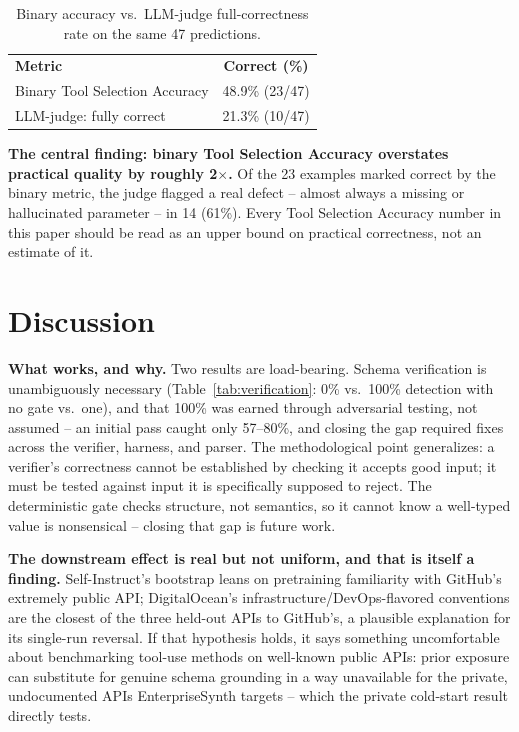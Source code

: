 \documentclass[letterpaper]{article} %
\begin{document}
\begin{table}[t]
\centering
\footnotesize
\setlength{\tabcolsep}{3pt}
\begin{tabular}{lc}
\textbf{Metric} & \textbf{Correct (\%)} \\
Binary Tool Selection Accuracy & 48.9\% (23/47) \\
LLM-judge: fully correct & 21.3\% (10/47) \\
\end{tabular}
\caption{Binary accuracy vs.\ LLM-judge full-correctness rate on the same 47 predictions.}
\label{tab:judge}
\end{table}

\textbf{The central finding: binary Tool Selection Accuracy overstates practical quality by
roughly 2$\times$.} Of the 23 examples marked correct by the binary metric, the judge flagged a
real defect -- almost always a missing or hallucinated parameter -- in 14 (61\%). Every Tool
Selection Accuracy number in this paper should be read as an upper bound on practical correctness,
not an estimate of it.

\section{Discussion}
\textbf{What works, and why.} Two results are load-bearing. Schema verification is unambiguously
necessary (Table~\ref{tab:verification}: 0\% vs.\ 100\% detection with no gate vs.\ one), and that
100\% was earned through adversarial testing, not assumed -- an initial pass caught only 57--80\%,
and closing the gap required fixes across the verifier, harness, and parser. The methodological
point generalizes: a verifier's correctness cannot be established by checking it accepts good
input; it must be tested against input it is specifically supposed to reject. The deterministic
gate checks structure, not semantics, so it cannot know a well-typed value is nonsensical --
closing that gap is future work.

\textbf{The downstream effect is real but not uniform, and that is itself a finding.}
Self-Instruct's bootstrap leans on pretraining familiarity with GitHub's extremely public API;
DigitalOcean's infrastructure/DevOps-flavored conventions are the closest of the three held-out
APIs to GitHub's, a plausible explanation for its single-run reversal. If that hypothesis holds, it
says something uncomfortable about benchmarking tool-use methods on well-known public APIs: prior
exposure can substitute for genuine schema grounding in a way unavailable for the private,
undocumented APIs EnterpriseSynth targets -- which the private cold-start result directly tests.
\end{document}
